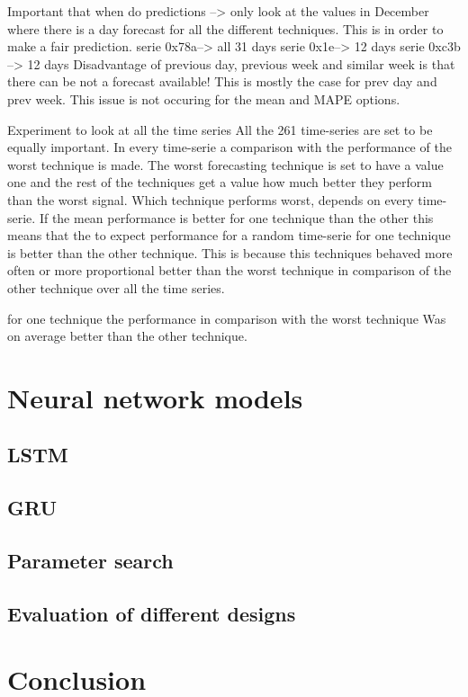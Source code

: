 Important that when do predictions --> only look at the values in December where there is a day forecast for all the different techniques. This is in order to make a fair prediction. 
serie 0x78a--> all 31 days
serie 0x1e--> 12 days
serie 0xc3b --> 12 days
Disadvantage of previous day, previous week and similar week is that there can be not a forecast available! 
This is mostly the case for prev day and prev week. This issue is not occuring for the mean and MAPE options. 

Experiment to look at all the time series
All the 261 time-series are set to be equally important. In every time-serie a comparison with the performance of the worst technique is made.
The worst forecasting technique is set to have a value one and the rest of the techniques get a value how much better they perform than the worst signal. Which technique performs worst, depends on every time-serie.
If the mean performance is better for one technique than the other this means that the to expect performance for a random time-serie for one technique is better than the other technique. This is because this techniques behaved  more often or more proportional better than the worst technique in comparison of the other technique over all the time series. 


for one technique the performance in comparison with the worst technique 
Was on average better than the other technique. 


\section{Neural network models}\label{s:Neural network models}

\subsection{LSTM}

\subsection{GRU}

\subsection{Parameter search}

\subsection{Evaluation of different designs}


\section{Conclusion}


